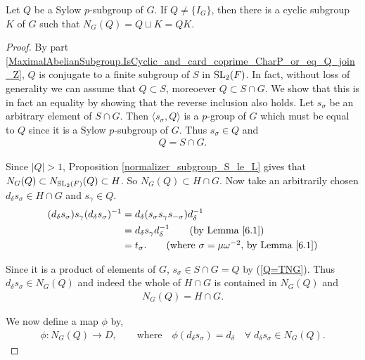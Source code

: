 \begin{theorem}
  \label{MaximalAbelianSubgroup.exists_IsCyclic_K_normalizer_eq_Q_join_K}
  Let $Q$ be a Sylow $p$-subgroup of $G$. If $Q \neq \{I_G\}$, then there is a cyclic subgroup $K$ of $G$ such that $N_G(Q) = Q \sqcup K = QK$. \\
\end{theorem}
\begin{proof}
By part \ref{MaximalAbelianSubgroup.IsCyclic_and_card_coprime_CharP_or_eq_Q_join_Z}, $Q$ is conjugate to a finite subgroup of $S$ in $\operatorname{SL}_2(F)$. In fact, without loss of generality we can assume that $Q \subset S$, moreoever $Q \subset S \cap G$. We show that this is in fact an equality by showing that the reverse inclusion also holds. 
Let $s_\sigma$ be an arbitrary element of $S \cap G$. Then $\langle s_\sigma, Q \rangle$ is a $p$-group of $G$ which must be equal to $Q$ since it is a Sylow $p$-subgroup of $G$. Thus $s_\sigma \in Q$ and
\begin{align}\label{Q=TNG} Q = S \cap G.
\end{align}

Since $|Q| > 1$, Proposition \ref{normalizer_subgroup_S_le_L} gives that $N_G(Q) \subset N_{\operatorname{SL}_2(F)}(Q) \subset H$. So $N_G(Q) \subset H \cap G$. Now take an arbitrarily chosen $d_\delta s_\sigma \in H \cap G$ and $s_\gamma \in Q$.
\begin{align*} (d_\delta s_\sigma) s_\gamma (d_\delta s_\sigma)^{-1} &= d_\delta ( s_\sigma s_\gamma  s_{-\sigma}) d^{-1}_\delta
\\ &=  d_\delta s_\gamma d^{-1}_\delta \tag{by Lemma \ref{6.1}}
\\ &= t_\sigma. \tag{where $\sigma = \mu \omega^{-2}$, by Lemma \ref{6.1}}
\end{align*}

Since it is a product of elements of $G$, $s_\sigma \in S \cap G = Q$ by (\ref{Q=TNG}). Thus $d_\delta s_\sigma \in N_G(Q)$ and indeed the whole of $H \cap G$ is contained in $N_G(Q)$ and
\begin{align}\label{normQ=HNG} N_G(Q) = H \cap G.
\end{align}

We now define a map $\phi$ by,
\begin{align*} \phi : N_G(Q) \longrightarrow D, \qquad \text{where} \quad \! \phi(d_\delta s_\sigma) = d_\delta \quad \forall \; d_\delta s_\sigma \in N_G(Q).
\end{align*}


\end{proof}
